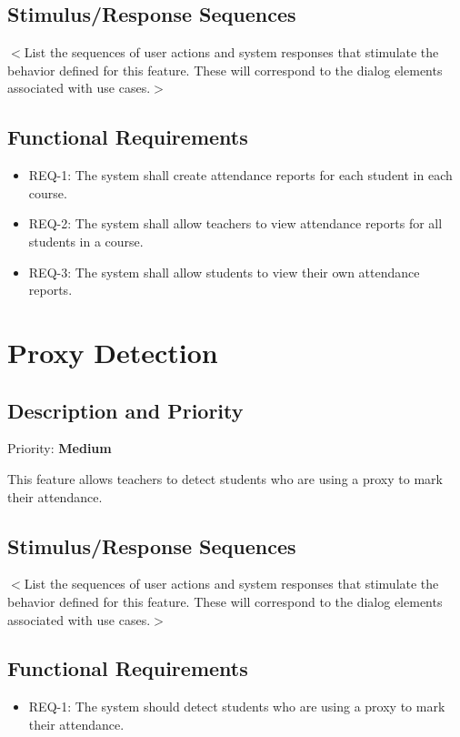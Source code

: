 \documentclass{scrreprt}
\begin{document}
\subsection{Stimulus/Response Sequences}
$<$List the sequences of user actions and system responses that stimulate the 
behavior defined for this feature. These will correspond to the dialog elements 
associated with use cases.$>$

\subsection{Functional Requirements}
\begin{itemize}
    \item REQ-1: The system shall create attendance reports for each student in each course.
    \item REQ-2: The system shall allow teachers to view attendance reports for all students in a course.
    \item REQ-3: The system shall allow students to view their own attendance reports.
\end{itemize}


\section{Proxy Detection}
\subsection{Description and Priority}
Priority: \textbf{Medium}

This feature allows teachers to detect students who are using a proxy to mark their attendance.
\subsection{Stimulus/Response Sequences}
$<$List the sequences of user actions and system responses that stimulate the 
behavior defined for this feature. These will correspond to the dialog elements 
associated with use cases.$>$

\subsection{Functional Requirements}
\begin{itemize}
    \item REQ-1: The system should detect students who are using a proxy to mark their attendance.
\end{itemize}
\end{document}
